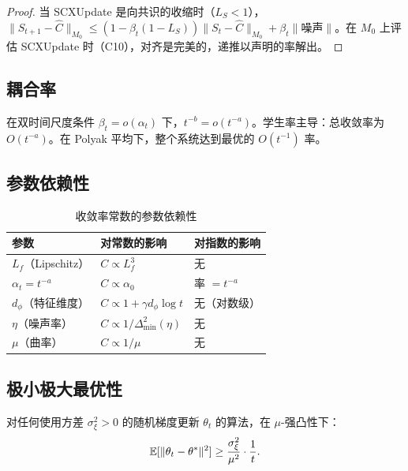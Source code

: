 \begin{proof}
当 SCXUpdate 是向共识的收缩时（$L_S < 1$），$\|S_{t+1} - \hat{C}\|_{M_0} \leq (1 - \beta_t(1 - L_S)) \|S_t - \hat{C}\|_{M_0} + \beta_t \|噪声\|$。在 $M_0$ 上评估 SCXUpdate 时（C10），对齐是完美的，递推以声明的率解出。
\end{proof}

\subsection{耦合率}

在双时间尺度条件 $\beta_t = o(\alpha_t)$ 下，$t^{-b} = o(t^{-a})$。学生率主导：总收敛率为 $O(t^{-a})$。在 Polyak 平均下，整个系统达到最优的 $O(t^{-1})$ 率。

\subsection{参数依赖性}

\begin{table}[ht]
\centering
\caption{收敛率常数的参数依赖性}
\label{tab:params}
\begin{tabular}{@{}lll@{}}
\toprule
参数 & 对常数的影响 & 对指数的影响 \\
\midrule
$L_f$（Lipschitz） & $C \propto L_f^3$ & 无 \\
$\alpha_t = t^{-a}$ & $C \propto \alpha_0$ & 率 $= t^{-a}$ \\
$d_\phi$（特征维度） & $C \propto 1 + \gamma d_\phi \log t$ & 无（对数级） \\
$\eta$（噪声率） & $C \propto 1/\Delta_{\min}^2(\eta)$ & 无 \\
$\mu$（曲率） & $C \propto 1/\mu$ & 无 \\
\bottomrule
\end{tabular}
\end{table}

\subsection{极小极大最优性}

\begin{theorem}[极小极大下界]\label{thm:minimax-lower}
对任何使用方差 $\sigma_\xi^2 > 0$ 的随机梯度更新 $\theta_t$ 的算法，在 $\mu$-强凸性下：
\begin{equation}
    \mathbb{E}[\|\theta_t - \theta^*\|^2] \geq \frac{\sigma_\xi^2}{\mu^2} \cdot \frac{1}{t}.
\end{equation}
\end{theorem}

